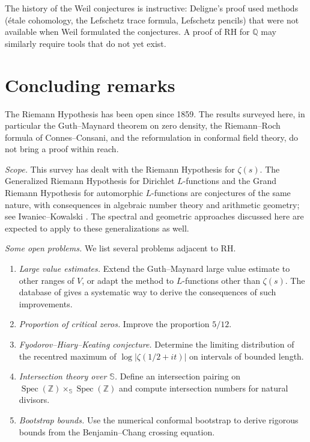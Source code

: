 \documentclass[11pt]{amsart}
\theoremstyle{definition}
\theoremstyle{remark}
\begin{document}
The history of the Weil conjectures is instructive: Deligne's proof \cite{deligne1974} used methods (\'etale cohomology, the Lefschetz trace formula, Lefschetz pencils) that were not available when Weil formulated the conjectures. A proof of RH for $\mathbb{Q}$ may similarly require tools that do not yet exist.

\section*{Concluding remarks}

The Riemann Hypothesis has been open since 1859. The results surveyed here, in particular the Guth--Maynard theorem on zero density, the Riemann--Roch formula of Connes--Consani, and the reformulation in conformal field theory, do not bring a proof within reach.

\emph{Scope.} This survey has dealt with the Riemann Hypothesis for $\zeta(s)$. The Generalized Riemann Hypothesis for Dirichlet $L$-functions and the Grand Riemann Hypothesis for automorphic $L$-functions are conjectures of the same nature, with consequences in algebraic number theory and arithmetic geometry; see Iwaniec--Kowalski \cite{iwaniec2004}. The spectral and geometric approaches discussed here are expected to apply to these generalizations as well.

\emph{Some open problems.} We list several problems adjacent to RH.
\begin{enumerate}[label=(\roman*)]
\item \emph{Large value estimates.} Extend the Guth--Maynard large value estimate to other ranges of $V$, or adapt the method to $L$-functions other than $\zeta(s)$. The database of \cite{tao2025} gives a systematic way to derive the consequences of such improvements.
\item \emph{Proportion of critical zeros.} Improve the proportion $5/12$.
\item \emph{Fyodorov--Hiary--Keating conjecture.} Determine the limiting distribution of the recentred maximum of $\log|\zeta(1/2+it)|$ on intervals of bounded length.
\item \emph{Intersection theory over $\mathbb{S}$.} Define an intersection pairing on $\operatorname{Spec}(\mathbb{Z}) \times_{\mathbb{S}} \operatorname{Spec}(\mathbb{Z})$ and compute intersection numbers for natural divisors.
\item \emph{Bootstrap bounds.} Use the numerical conformal bootstrap to derive rigorous bounds from the Benjamin--Chang crossing equation.
\end{enumerate}
\end{document}
